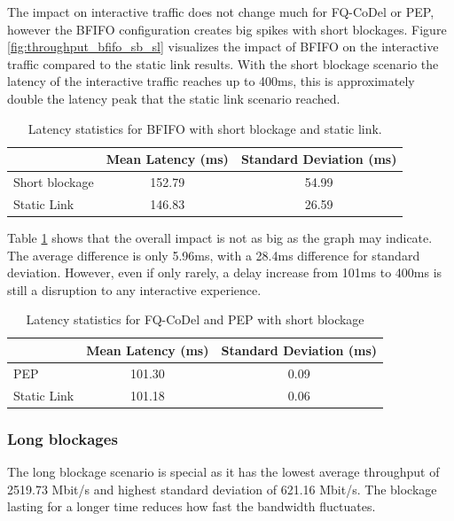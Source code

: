 \documentclass[a4paper,english, 12pt]{report}
\begin{document}
The impact on interactive traffic does not change much for FQ-CoDel or PEP, however the BFIFO configuration creates big spikes with short blockages. Figure \ref{fig:throughput_bfifo_sb_sl} visualizes the impact of BFIFO on the interactive traffic compared to the static link results. With the short blockage scenario the latency of the interactive traffic reaches up to 400ms, this is approximately double the latency peak that the static link scenario reached.\\

\begin{table}[h!]
\centering
\begin{tabular}{l|c|c}
\hline
 & \textbf{Mean Latency (ms)} & \textbf{Standard Deviation (ms)} \\
\hline
Short blockage   & 152.79 & 54.99 \\
Static Link  &  146.83 & 26.59 \\
\end{tabular}
\caption{Latency statistics for BFIFO with short blockage and static link.}
\label{tab:throughput_latency_bfifo_sl_sb}
\end{table}

Table \ref{tab:throughput_latency_bfifo_sl_sb} shows that the overall impact is not as big as the graph may indicate. The average difference is only 5.96ms, with a 28.4ms difference for standard deviation. However, even if only rarely, a delay increase from 101ms to 400ms is still a disruption to any interactive experience.\\

\begin{table}[h!]
\centering
\begin{tabular}{l|c|c}
\hline
 & \textbf{Mean Latency (ms)} & \textbf{Standard Deviation (ms)} \\
\hline
PEP   & 101.30 & 0.09 \\
Static Link  &  101.18 & 0.06 \\
\end{tabular}
\caption{Latency statistics for FQ-CoDel and PEP with short blockage}
\label{tab:throughput_latency_fqcodel_pep_sb}
\end{table}


\subsubsection{Long blockages}
The long blockage scenario is special as it has the lowest average throughput of 2519.73 Mbit/s and highest standard deviation of 621.16 Mbit/s. The blockage lasting for a longer time reduces how fast the bandwidth fluctuates.\\
\end{document}
